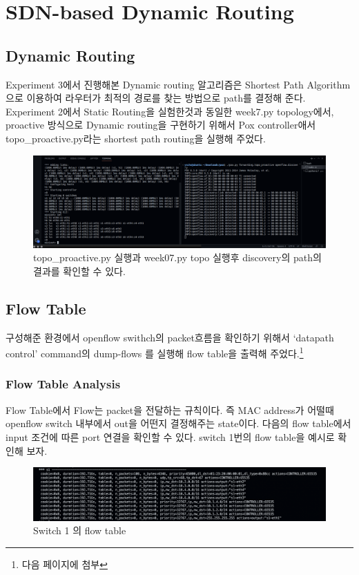 \section{SDN-based Dynamic Routing}
\subsection*{Dynamic Routing}
    Experiment 3에서 진행해본 Dynamic routing 알고리즘은 Shortest Path Algorithm 으로 이용하여 라우터가 최적의 경로를 찾는 방법으로 path를 결정해 준다. Experiment 2에서 Static Routing을 실험한것과 동일한  week7.py topology에서, proactive 방식으로 Dynamic routing을 구현하기 위해서 Pox controller애서 topo\_proactive.py라는 shortest path routing을 실행해 주었다.\\
    \vspace{-4mm}
    \begin{figure}[!h]\centering 
    	\includegraphics[width=.99\textwidth]{image/week08/3-0.png}
    	\caption{\footnotesize
    	 topo\_proactive.py 실행과 week07.py topo 실행후 discovery의 path의 결과를 확인할 수 있다.}
    	\vspace{-10pt}
    \end{figure}
        \vspace{-2mm}
    \subsection*{Flow Table}
    구성해준 환경에서 openflow swithch의 packet흐름을 확인하기 위해서 ‘datapath control’ command의 dump-flows 를 실행해 flow table을 출력해 주었다.\footnote{다음 페이지에 첨부}
        \subsubsection*{Flow Table Analysis}
        Flow Table에서 Flow는 packet을 전달하는 규칙이다. 즉 MAC address가 어떨때 openflow switch 내부에서 out을 어떤지 결정해주는 state이다. 다음의 flow table에서 input 조건에 따른 port 연결을 확인할 수 있다. switch 1번의 flow table을 예시로 확인해 보자.\\
        \vspace{-4mm}
        \begin{figure}[!h]\centering 
        	\includegraphics[width=.99\textwidth]{image/week08/3-1-1-1.png}
        	\caption{\footnotesize
        	  Switch 1 의 flow table}
        	\vspace{-10pt}
        \end{figure}
        
